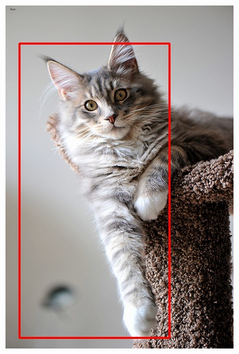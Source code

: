 \documentclass[conference,compsoc]{IEEEtran}
\begin{document}
\begin{figure}
	\begin{multicols}{4}
    		\includegraphics[height=1.35\linewidth]{naisubodi2.jpg}\par 

\end{multicols}
\end{figure}
\end{document}

